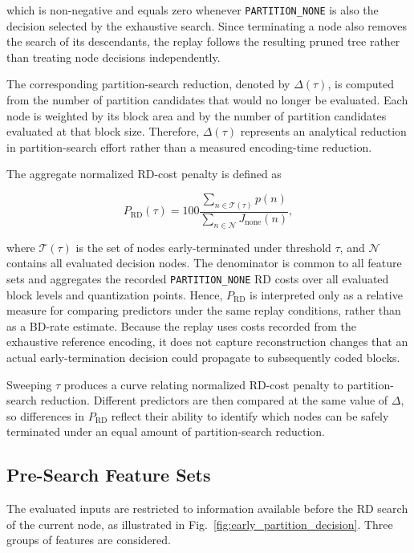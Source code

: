 \documentclass{article}
\begin{document}
which is non-negative and equals zero whenever \texttt{PARTITION\_NONE} is also the decision selected by the exhaustive search. Since terminating a node also removes the search of its descendants, the replay follows the resulting pruned tree rather than treating node decisions independently.

The corresponding partition-search reduction, denoted by $\Delta(\tau)$, is computed from the number of partition candidates that would no longer be evaluated. Each node is weighted by its block area and by the number of partition candidates evaluated at that block size. Therefore, $\Delta(\tau)$ represents an analytical reduction in partition-search effort rather than a measured encoding-time reduction.

The aggregate normalized RD-cost penalty is defined as

\begin{equation}
P_{\mathrm{RD}}(\tau)=
100
\frac{
\sum_{n\in\mathcal{T}(\tau)} p(n)
}{
\sum_{n\in\mathcal{N}} J_{\mathrm{none}}(n)
},
\end{equation}

where $\mathcal{T}(\tau)$ is the set of nodes early-terminated under threshold $\tau$, and $\mathcal{N}$ contains all evaluated decision nodes. The denominator is common to all feature sets and aggregates the recorded \texttt{PARTITION\_NONE} RD costs over all evaluated block levels and quantization points. Hence, $P_{\mathrm{RD}}$ is interpreted only as a relative measure for comparing predictors under the same replay conditions, rather than as a BD-rate estimate. Because the replay uses costs recorded from the exhaustive reference encoding, it does not capture reconstruction changes that an actual early-termination decision could propagate to subsequently coded blocks.

Sweeping $\tau$ produces a curve relating normalized RD-cost penalty to partition-search reduction. Different predictors are then compared at the same value of $\Delta$, so differences in $P_{\mathrm{RD}}$ reflect their ability to identify which nodes can be safely terminated under an equal amount of partition-search reduction.

\subsection{Pre-Search Feature Sets}
\label{sec:features}

The evaluated inputs are restricted to information available before the RD search of the current node, as illustrated in Fig.~\ref{fig:early_partition_decision}. Three groups of features are considered.
\end{document}
